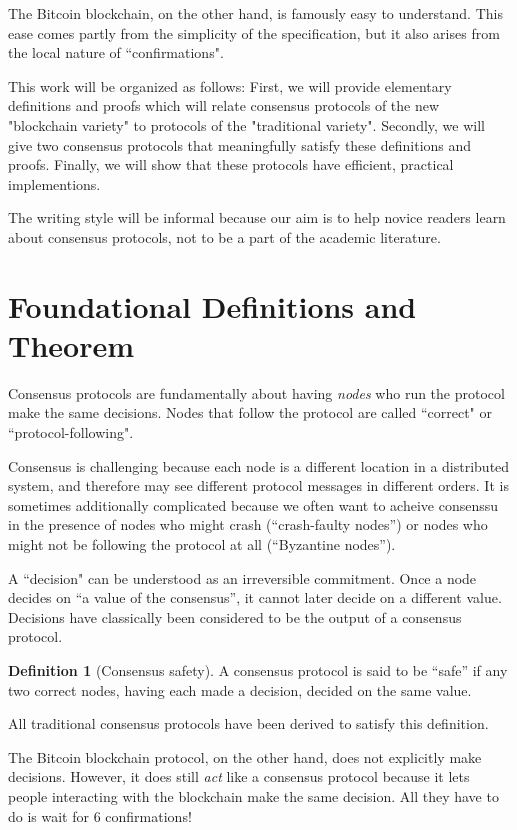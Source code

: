 \documentclass{article}
\theoremstyle{definition}
\newtheorem{defn}{Definition}[section]
\begin{document}
The Bitcoin blockchain, on the other hand, is famously easy to understand. This ease comes partly from the simplicity of the specification, but it also arises from the local nature of ``confirmations".

This work will be organized as follows: First, we will provide elementary definitions and proofs which will relate consensus protocols of the new "blockchain variety" to protocols of the "traditional variety". Secondly, we will give two consensus protocols that meaningfully satisfy these definitions and proofs. Finally, we will show that these protocols have efficient, practical implementions.

The writing style will be informal because our aim is to help novice readers learn about consensus protocols, not to be a part of the academic literature.

\section{Foundational Definitions and Theorem}

Consensus protocols are fundamentally about having \emph{nodes} who run the protocol make the same decisions. Nodes that follow the protocol are called ``correct" or ``protocol-following". 

Consensus is challenging because each node is a different location in a distributed system, and therefore may see different protocol messages in different orders. It is sometimes additionally complicated because we often want to acheive consenssu in the presence of nodes who might crash (``crash-faulty nodes'') or nodes who might not be following the protocol at all (``Byzantine nodes'').

A ``decision" can be understood as an irreversible commitment. Once a node decides on ``a value of the consensus'', it cannot later decide on a different value. Decisions have classically been considered to be the output of a consensus protocol.

\begin{defn}[Consensus safety]
A consensus protocol is said to be ``safe” if any two correct nodes, having each made a decision, decided on the same value.
\end{defn}

All traditional consensus protocols have been derived to satisfy this definition.

The Bitcoin blockchain protocol, on the other hand, does not explicitly make decisions. However, it does still \emph{act} like a consensus protocol because it lets people interacting with the blockchain make the same decision. All they have to do is wait for 6 confirmations!
\end{document}
